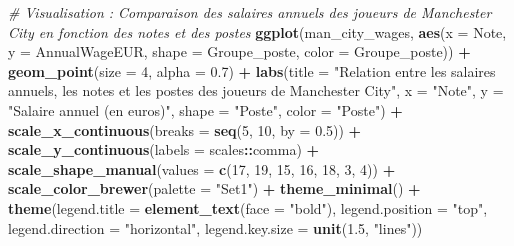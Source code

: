 \documentclass[
]{article}
\newenvironment{Shaded}{\begin{snugshade}}{\end{snugshade}}
\newcommand{\AttributeTok}[1]{\textcolor[rgb]{0.13,0.29,0.53}{#1}}
\newcommand{\CommentTok}[1]{\textcolor[rgb]{0.56,0.35,0.01}{\textit{#1}}}
\newcommand{\DecValTok}[1]{\textcolor[rgb]{0.00,0.00,0.81}{#1}}
\newcommand{\FloatTok}[1]{\textcolor[rgb]{0.00,0.00,0.81}{#1}}
\newcommand{\FunctionTok}[1]{\textcolor[rgb]{0.13,0.29,0.53}{\textbf{#1}}}
\newcommand{\NormalTok}[1]{#1}
\newcommand{\SpecialCharTok}[1]{\textcolor[rgb]{0.81,0.36,0.00}{\textbf{#1}}}
\newcommand{\StringTok}[1]{\textcolor[rgb]{0.31,0.60,0.02}{#1}}
\begin{document}
\begin{Shaded}
\begin{Highlighting}[]
\CommentTok{\# Visualisation : Comparaison des salaires annuels des joueurs de Manchester City en fonction des notes et des postes}
\FunctionTok{ggplot}\NormalTok{(man\_city\_wages, }\FunctionTok{aes}\NormalTok{(}\AttributeTok{x =}\NormalTok{ Note, }\AttributeTok{y =}\NormalTok{ AnnualWageEUR, }\AttributeTok{shape =}\NormalTok{ Groupe\_poste, }\AttributeTok{color =}\NormalTok{ Groupe\_poste)) }\SpecialCharTok{+}
  \FunctionTok{geom\_point}\NormalTok{(}\AttributeTok{size =} \DecValTok{4}\NormalTok{, }\AttributeTok{alpha =} \FloatTok{0.7}\NormalTok{) }\SpecialCharTok{+}
  \FunctionTok{labs}\NormalTok{(}\AttributeTok{title =} \StringTok{"Relation entre les salaires annuels, les notes et les postes des joueurs de Manchester City"}\NormalTok{,}
       \AttributeTok{x =} \StringTok{"Note"}\NormalTok{,}
       \AttributeTok{y =} \StringTok{"Salaire annuel (en euros)"}\NormalTok{,}
       \AttributeTok{shape =} \StringTok{"Poste"}\NormalTok{,}
       \AttributeTok{color =} \StringTok{"Poste"}\NormalTok{) }\SpecialCharTok{+}
  \FunctionTok{scale\_x\_continuous}\NormalTok{(}\AttributeTok{breaks =} \FunctionTok{seq}\NormalTok{(}\DecValTok{5}\NormalTok{, }\DecValTok{10}\NormalTok{, }\AttributeTok{by =} \FloatTok{0.5}\NormalTok{)) }\SpecialCharTok{+}
  \FunctionTok{scale\_y\_continuous}\NormalTok{(}\AttributeTok{labels =}\NormalTok{ scales}\SpecialCharTok{::}\NormalTok{comma) }\SpecialCharTok{+}
  \FunctionTok{scale\_shape\_manual}\NormalTok{(}\AttributeTok{values =} \FunctionTok{c}\NormalTok{(}\DecValTok{17}\NormalTok{, }\DecValTok{19}\NormalTok{, }\DecValTok{15}\NormalTok{, }\DecValTok{16}\NormalTok{, }\DecValTok{18}\NormalTok{, }\DecValTok{3}\NormalTok{, }\DecValTok{4}\NormalTok{)) }\SpecialCharTok{+}
  \FunctionTok{scale\_color\_brewer}\NormalTok{(}\AttributeTok{palette =} \StringTok{"Set1"}\NormalTok{) }\SpecialCharTok{+}
  \FunctionTok{theme\_minimal}\NormalTok{() }\SpecialCharTok{+}
  \FunctionTok{theme}\NormalTok{(}\AttributeTok{legend.title =} \FunctionTok{element\_text}\NormalTok{(}\AttributeTok{face =} \StringTok{"bold"}\NormalTok{),}
        \AttributeTok{legend.position =} \StringTok{"top"}\NormalTok{,}
        \AttributeTok{legend.direction =} \StringTok{"horizontal"}\NormalTok{,}
        \AttributeTok{legend.key.size =} \FunctionTok{unit}\NormalTok{(}\FloatTok{1.5}\NormalTok{, }\StringTok{"lines"}\NormalTok{))}
\end{Highlighting}
\end{Shaded}
\end{document}
